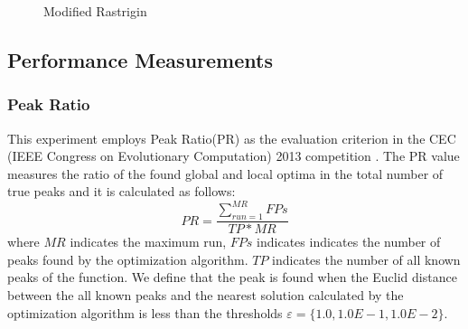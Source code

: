 \documentclass[conference]{IEEEtran}
\begin{document}
\begin{description}
\begin{figure}[h]
\begin{center}
\caption{Modified Rastrigin}
\label{fig:f4}
\end{center}
\end{figure}

\end{description}

\subsection{Performance Measurements}
\subsubsection{Peak Ratio}
This experiment employs Peak Ratio(PR) \cite{CDE} as the evaluation criterion in the CEC (IEEE Congress on Evolutionary Computation) 2013 competition \cite{cec2013}. The PR value measures the ratio of the found global and local optima in the total number of true peaks and it is calculated as follows: 
\begin{equation}
\label{eq:PR}
PR=\frac{\sum_{run=1}^{MR}FPs}{TP*MR}
\end{equation}
 where ${MR}$ indicates the maximum run, ${FPs}$ indicates indicates the number of peaks found by the optimization algorithm. ${TP}$ indicates the number of all known peaks of the function. We define that the peak is found when the Euclid distance between the all known peaks and the nearest solution calculated by the optimization algorithm is less than the thresholds $\varepsilon = \{1.0, 1.0E-1, 1.0E-2\}$.
\end{document}
